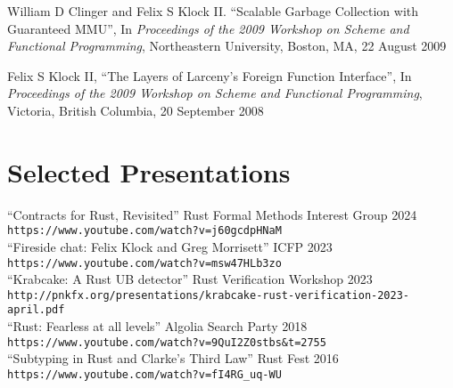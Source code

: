 \documentclass[margin,line,draft]{res}
\newcommand{\mysidestyle}{\sc}
\begin{document}
\begin{resume}
    William D Clinger and Felix S Klock II. ``Scalable Garbage Collection with Guaranteed MMU'', In \textsl{Proceedings of the 2009 Workshop on Scheme and Functional Programming}, Northeastern University, Boston, MA, 22 August 2009

\vspace{-2mm}

    Felix S Klock II, ``The Layers of Larceny's Foreign Function Interface'', 
    In \textsl{Proceedings of the 2009 Workshop on Scheme and Functional Programming}, Victoria, British Columbia, 20 September 2008

    \section{\mysidestyle Selected Presentations}
    ``Contracts for Rust, Revisited'' Rust Formal Methods Interest Group 2024\\ {\small\verb|https://www.youtube.com/watch?v=j60gcdpHNaM|}\\
    ``Fireside chat: Felix Klock and Greg Morrisett'' ICFP 2023\\ {\small\verb|https://www.youtube.com/watch?v=msw47HLb3zo|}\\
    ``Krabcake: A Rust UB detector'' Rust Verification Workshop 2023\\ {\small\verb|http://pnkfx.org/presentations/krabcake-rust-verification-2023-april.pdf|}\\
    ``Rust: Fearless at all levels'' Algolia Search Party 2018\\ {\small\verb|https://www.youtube.com/watch?v=9QuI2Z0stbs&t=2755|}\\
    ``Subtyping in Rust and Clarke's Third Law'' Rust Fest 2016\\ {\small\verb|https://www.youtube.com/watch?v=fI4RG_uq-WU|}\\

\end{resume}
\end{document}
